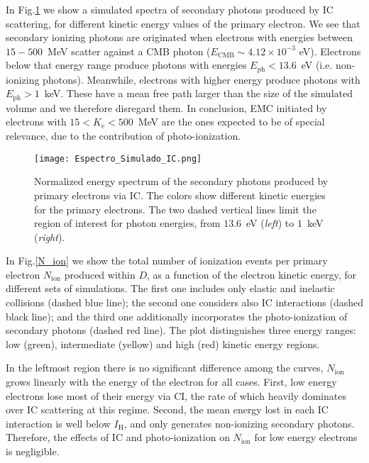 \documentclass[baaa]{baaa}
\begin{document}
In Fig.\ref{Espectro_IC} we show a simulated spectra of secondary photons produced by IC scattering, for different kinetic energy values of the primary electron. We see that secondary ionizing photons are originated when electrons with energies between $15-500$~MeV scatter against a CMB photon ($E_{\mathrm{CMB}} \sim 4.12 \times 10^{-3}$ eV). Electrons below that energy range produce photons with energies $E_{\mathrm{ph}}< 13.6$~eV (i.e. non-ionizing photons). Meanwhile, electrons with higher energy produce photons with $E_{\mathrm{ph}} > 1$~keV. These have a mean free path larger than the size of the simulated volume and we therefore disregard them. In conclusion, EMC initiated by electrons with $15 < K_{\mathrm{e}} < 500$~MeV are the ones expected to be of special relevance, due to the contribution of photo-ionization. 


\begin{figure}[!h]
\centering
\texttt{[image: Espectro\_Simulado\_IC.png]}
\caption{Normalized energy spectrum of the secondary photons produced by primary electrons via IC. The colors show different kinetic energies for the primary electrons. The two dashed vertical lines limit the region of interest for photon energies, from $13.6$~eV (\textit{left}) to $1$~keV (\textit{right}).}
\label{Espectro_IC}
\end{figure}

In Fig.\ref{N_ion} we show the total number of ionization events per primary electron $N_{\mathrm{ion}}$ produced within $D$, as a function of the electron kinetic energy, for different sets of simulations. The first one includes only elastic and inelastic collisions (dashed blue line); the second one considers also IC interactions (dashed black line); and the third one additionally incorporates the photo-ionization of secondary photons (dashed red line). The plot distinguishes three energy ranges: low (green), intermediate (yellow) and high (red) kinetic energy regions.

In the leftmost region there is no significant difference among the curves, $N_{\mathrm{ion}}$ grows linearly with the energy of the electron for all cases. First, low energy electrons lose most of their energy via CI, the rate of which heavily dominates over IC scattering at this regime. Second, the mean energy lost in each IC interaction is well below $I_{\mathrm{H}}$, and only generates non-ionizing secondary photons. Therefore, the effects of IC and photo-ionization on $N_{\mathrm{ion}}$ for low energy electrons is negligible.
\end{document}
